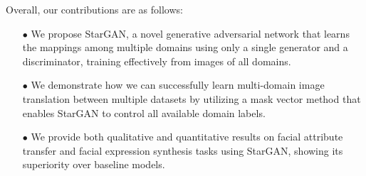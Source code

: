 \documentclass[10pt,twocolumn,letterpaper]{article}
\begin{document}

\vspace{4px}

Overall, our contributions are as follows: 
\begin{enumerate}
\item[$\bullet$] We propose StarGAN, a novel generative adversarial network that learns the mappings among multiple domains using only a single generator and a discriminator, training effectively from images of all domains.
\item[$\bullet$] We demonstrate how we can successfully learn multi-domain image translation between multiple datasets by utilizing a mask vector method that enables StarGAN to control all available domain labels.
\item[$\bullet$] We provide both qualitative and quantitative results on facial attribute transfer and facial expression synthesis tasks using StarGAN, showing its superiority over baseline models.

\end{enumerate}
\end{document}
